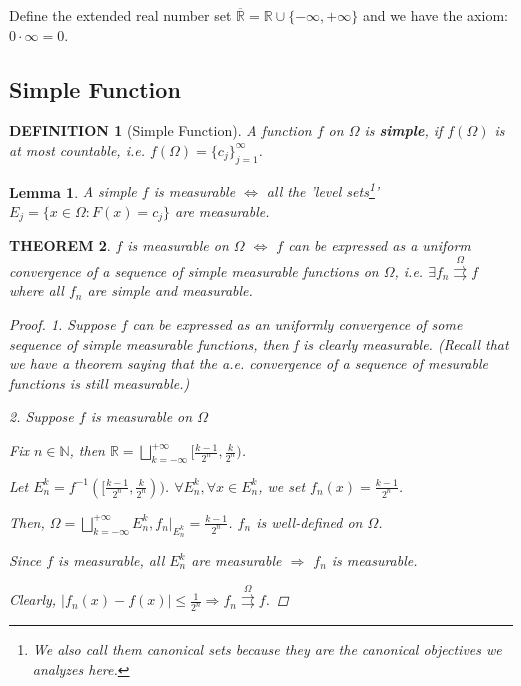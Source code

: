 \documentclass[12pt]{article}
\theoremstyle{blueplain}
\newtheorem{theorem}{THEOREM}[section]
\newtheorem{lemma}[theorem]{Lemma}
\theoremstyle{bluedef}
\newtheorem{definition}{DEFINITION}[section]
\theoremstyle{blueremark}
\newcommand{\R}{\mathbb{R}}
\newcommand{\N}{\mathbb{N}}
\numberwithin{equation}{section}
\begin{document}
\noindent Define the extended real number set $\overline{\mathbb{R}} = \mathbb{R} \cup \{-\infty, +\infty\}$ and we have the axiom: $0 \cdot \infty = 0$.

\clearpage

\subsection{Simple Function}

\begin{definition}[Simple Function]

  A function $f$ on $\Omega$ is \textbf{simple}, if $f(\Omega)$ is at most countable, i.e. $f(\Omega) = \{c_j\}_{j=1}^\infty$.
\end{definition}

\begin{lemma}
  A simple $f$ is measurable $\iff$ all the 'level sets\footnote[1]{We also call them canonical sets because they are the canonical objectives we analyzes here.}' $E_j = \{x \in \Omega \colon F(x) = c_j\}$ are measurable.
\end{lemma}

\begin{theorem}
  $f$ is measurable on $\Omega$ $\iff$ $f$ can be expressed as a uniform convergence of a sequence of simple measurable functions on $\Omega$, i.e. $\exists f_n \overset{\Omega}{\rightrightarrows} f$ where all $f_n$ are simple and measurable.
  \begin{proof}
    1. Suppose $f$ can be expressed as an uniformly convergence of some sequence of simple measurable functions, then f is clearly measurable. (Recall that we have a theorem saying that the a.e. convergence of a sequence of mesurable functions is still measurable.)

    2. Suppose $f$ is measurable on $\Omega$

    Fix $n \in \N$, then $\R = \bigsqcup_{k = -\infty}^{+\infty} [\frac{k-1}{2^n}, \frac{k}{2^n})$.

    Let $E_n^k = f^{-1}([\frac{k-1}{2^n}, \frac{k}{2^n}))$. $\forall E_n^k, \forall x \in E_n^k$, we set $f_n(x) = \frac{k-1}{2^n}$.

    Then, $\Omega = \bigsqcup_{k = -\infty}^{+\infty} E_n^k, f_n|_{E_n^k} = \frac{k-1}{2^n}$. $f_n$ is well-defined on $\Omega$.

    Since $f$ is measurable, all $E_n^k$ are measurable $\Rightarrow$ $f_n$ is measurable.

    Clearly, $|f_n(x) - f(x)| \leq \frac{1}{2^n} \Rightarrow f_n \overset{\Omega}{\rightrightarrows} f$.
  \end{proof}
\end{theorem}
\end{document}
